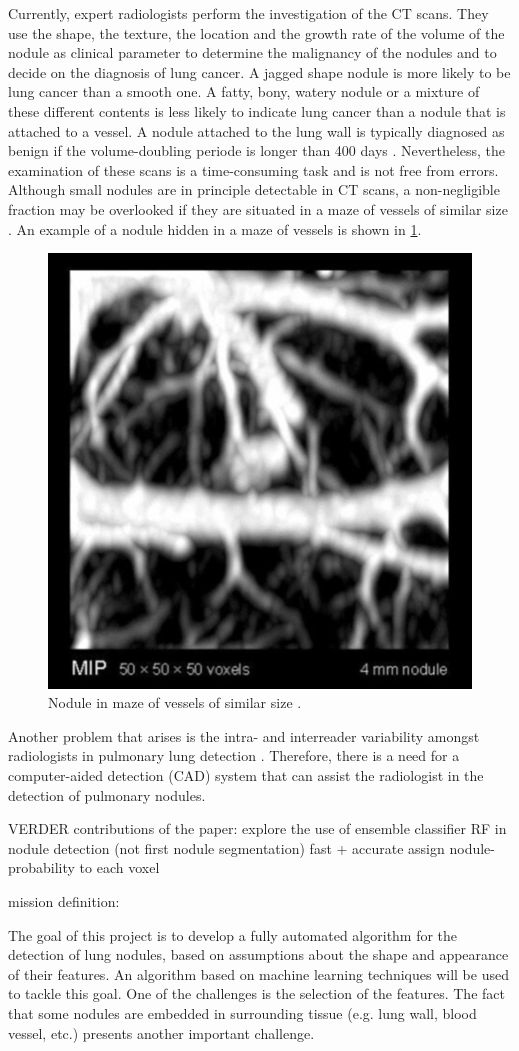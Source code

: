 Currently, expert radiologists perform the investigation of the
CT scans. They use the shape, the texture, the location and the growth rate of
the volume of the nodule as clinical parameter to determine the malignancy of
the nodules and to decide on the diagnosis of lung cancer. A jagged shape
nodule is more likely to be lung cancer than a smooth one. A fatty, bony,
watery nodule or a mixture of these different contents is less likely to
indicate lung cancer than a nodule that is attached to a vessel. A nodule
attached to the lung wall is typically diagnosed as benign if the
volume-doubling periode is longer than 400 days \cite{wu}. Nevertheless, the
examination of these scans is a time-consuming task and is not free from errors.
Although small nodules are in principle detectable in CT scans, a non-negligible
fraction may be overlooked if they are situated in a maze of vessels of similar
size \cite{ozekes}. An example of a nodule hidden in a maze of vessels is shown
in \ref{nodmaze}.
\begin{figure}[htp]
\begin{center}
  \includegraphics[width= 30 mm]{img/noduleMaze.png}
  \caption{Nodule in maze of vessels of similar size \cite{noduleMaze}.}
  \label{nodmaze}
\end{center}
\end{figure}
Another problem that arises is the intra- and interreader variability
amongst radiologists in pulmonary lung detection \cite{armato} \cite{hens}. Therefore,
there is a need for a computer-aided detection (CAD) system that can assist the
radiologist in the detection of pulmonary nodules.

VERDER
contributions of the paper: explore the use of ensemble classifier RF in nodule detection (not first nodule
segmentation)
fast + accurate
assign nodule-probability to each voxel


mission definition:

The goal of this project is to develop a fully automated algorithm for the
detection of lung nodules, based on assumptions about the shape and appearance of their
features. An algorithm based on machine learning techniques will be used to
tackle this goal. One of the challenges is the selection of the features. The
fact that some nodules are embedded in surrounding tissue (e.g.
lung wall, blood vessel, etc.) presents another important challenge.



